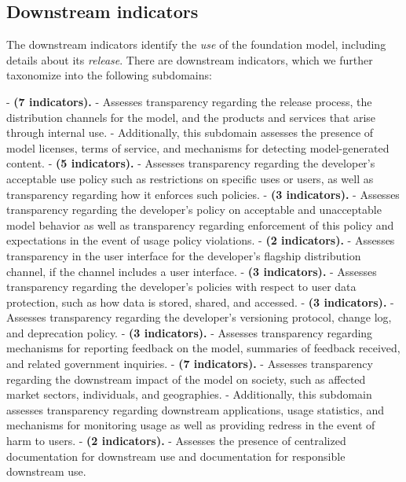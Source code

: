 \hypertarget{downstream-indicators}{\subsection{Downstream indicators}}
\label{sec:downstream-indicators}
The downstream indicators identify the \emph{use} of the foundation model, including details about its \textit{release}.
There are \numdownstreamindicators downstream indicators, which we further taxonomize into the following \numdownstreamsubdomains subdomains:

-  \textbf{\distribution (7 indicators).}
- Assesses transparency regarding the release process, the distribution channels for the model, and the products and services that arise through internal use.
- Additionally, this subdomain assesses the presence of model licenses, terms of service, and mechanisms for detecting model-generated content.
-  \textbf{\usagepolicy (5 indicators).}
- Assesses transparency regarding the developer's acceptable use policy such as restrictions on specific uses or users, as well as transparency regarding how it enforces such policies.
-  \textbf{\modelbehaviorpolicy (3 indicators).}
- Assesses transparency regarding the developer's policy on acceptable and unacceptable model behavior as well as transparency regarding enforcement of this policy and expectations in the event of usage policy violations.
-  \textbf{\interface (2 indicators).}
- Assesses transparency in the user interface for the developer's flagship distribution channel, if the channel includes a user interface.
-  \textbf{\dataprotection (3 indicators).}
- Assesses transparency regarding the developer's policies with respect to user data protection, such as how data is stored, shared, and accessed.
-  \textbf{\updates(3 indicators).}
- Assesses transparency regarding the developer's versioning protocol, change log, and deprecation policy.
-  \textbf{\feedback (3 indicators).}
- Assesses transparency regarding mechanisms for reporting feedback on the model, summaries of feedback received, and related government inquiries.
-  \textbf{\impact (7 indicators).}
- Assesses transparency regarding the downstream impact of the model on society, such as affected market sectors, individuals, and geographies.
- Additionally, this subdomain assesses transparency regarding downstream applications, usage statistics, and mechanisms for monitoring usage as well as providing redress in the event of harm to users.
-  \textbf{\documentation (2 indicators).}
- Assesses the presence of centralized documentation for downstream use and documentation for responsible downstream use.

